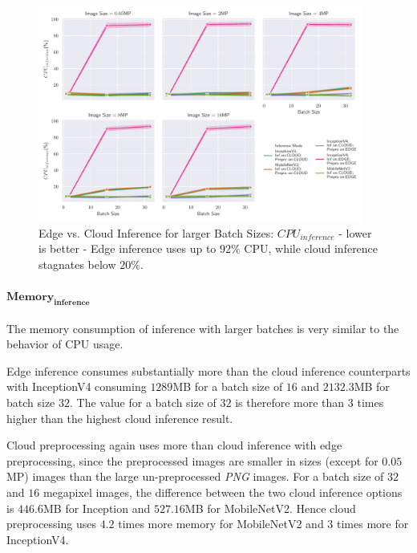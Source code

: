 \begin{figure}[!htb]
\centering
\includegraphics[width=0.95\textwidth]{./Bilder/single_plots/batch_size_plots/Effects_of_Batch_size_Inference_CPU_Usage.pdf}
\caption[Edge vs. Cloud Inference for larger Batch Sizes:  $CPU_{inference}$ - lower is better]{Edge vs. Cloud Inference for larger Batch Sizes:  $CPU_{inference}$ - lower is better - Edge inference uses up to $92\%$ CPU, while cloud inference stagnates below $20\%$.}
\label{fig:BatchSizeInferenceCPU}
\end{figure}

\paragraph{$\mathbf{Memory_{inference}}$}
The memory consumption of inference with larger batches is very similar to the behavior of CPU usage.


Edge inference consumes substantially more than the cloud inference counterparts with InceptionV4 consuming $1289$MB for a batch size of $16$ and $2132.3$MB for batch size $32$.
The value for a batch size of $32$ is therefore more than $3$ times higher than the highest cloud inference result.

Cloud preprocessing again uses more than cloud inference with edge preprocessing, since the preprocessed images are smaller in sizes (except for $0.05$MP) images than the large un-preprocessed \emph{PNG} images.
For a batch size of $32$ and $16$ megapixel images, the difference between the two cloud inference options is $446.6$MB for Inception and $527.16$MB for MobileNetV2.
Hence cloud preprocessing uses $4.2$ times more memory for MobileNetV2 and $3$ times more for InceptionV4.



